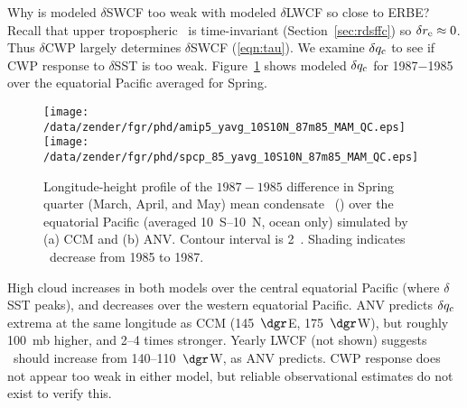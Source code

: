 \documentclass[agums]{aguplus}
\begin{document}
Why is modeled $\delta$SWCF too weak with modeled $\delta$LWCF so
close to ERBE?   
Recall that upper tropospheric \rdsffc\ is time-invariant
(Section~\ref{sec:rdsffc}) so $\delta \mbox{$r_\mathrm{e}$} \approx 0$.
Thus $\delta$CWP largely determines $\delta$SWCF (\ref{eqn:tau}).
We examine $\delta \mbox{$q_\mathrm{c}$}$ to see if CWP response to $\delta$SST is too
weak.
Figure~\ref{fig:yavg_10S10N_87m85_MAM_QC} shows modeled $\delta \mbox{$q_\mathrm{c}$}$
for 1987$-$1985 over the equatorial Pacific averaged for Spring. 
\begin{figure}
\begin{center}
\texttt{[image: /data/zender/fgr/phd/amip5\_yavg\_10S10N\_87m85\_MAM\_QC.eps]}\vfill
\texttt{[image: /data/zender/fgr/phd/spcp\_85\_yavg\_10S10N\_87m85\_MAM\_QC.eps]}\vfill
\end{center}
\caption[Longitude-height profile of the $1987-1985$ difference in
Spring quarter (March, April, and May) mean condensate \qc\ over the
equatorial Pacific simulated by CCM and ANV]{
Longitude-height profile of the $1987-1985$ difference in Spring
quarter (March, April, and May) mean condensate \qc\ (\mgxkg) over the
equatorial Pacific (averaged 10~\dgr S--10~\dgr N, 
ocean only) simulated by (a) CCM and (b) ANV.
Contour interval is 2~\mgxkg.
Shading indicates \qc\ decrease from 1985 to 1987.
\label{fig:yavg_10S10N_87m85_MAM_QC}}   
\end{figure}
High cloud increases in both models over the central equatorial
Pacific (where $\delta$SST peaks), and decreases over the western
equatorial Pacific.
ANV predicts $\delta \mbox{$q_\mathrm{c}$}$ extrema at the same longitude as CCM
(145~$\dgr$E, 175~$\dgr$W), but roughly 100~mb higher,
and 2--4 times stronger.
Yearly LWCF (not shown) suggests \qc\ should increase from
140--110~$\dgr$W, as ANV predicts.  
CWP response does not appear too weak in either model, but reliable
observational estimates do not exist to verify this.
\end{document}
